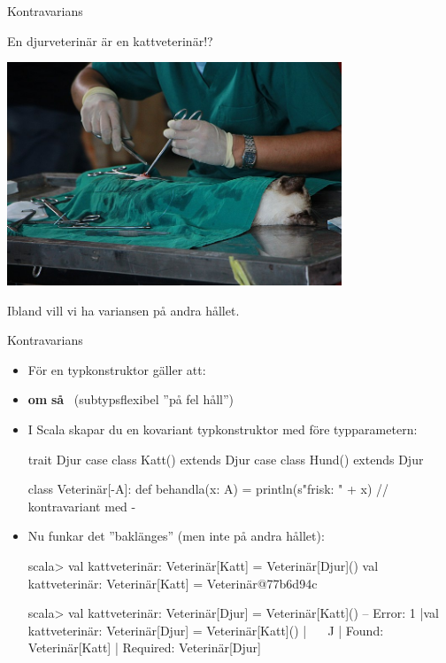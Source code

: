 \begin{Slide}{Kontravarians}
\begin{center}
En djurveterinär är en kattveterinär!?

\includegraphics[width=0.75\textwidth]{../img/cat-vet.jpg}  

Ibland vill vi ha variansen på andra hållet.
\end{center}
\end{Slide}

\begin{Slide}{Kontravarians }
\begin{itemize}\SlideFontSmall
\item För en  typkonstruktor  gäller att: 
\item[] \textbf{om}  \textbf{så} ~(subtypsflexibel ''på fel håll'')
\item I Scala skapar du en kovariant typkonstruktor med \code{-} före typparametern:
\begin{Code}
trait Djur 
case class Katt() extends Djur
case class Hund() extends Djur

class Veterinär[-A]:
  def behandla(x: A) = println(s"frisk: " + x)  // kontravariant med -
\end{Code}
\pause
\item Nu funkar det ''baklänges'' (men inte på andra hållet):
\begin{REPLsmall}
scala> val kattveterinär: Veterinär[Katt] = Veterinär[Djur]()
val kattveterinär: Veterinär[Katt] = Veterinär@77b6d94c

scala> val kattveterinär: Veterinär[Djur] = Veterinär[Katt]()
-- Error:
1 |val kattveterinär: Veterinär[Djur] = Veterinär[Katt]()
  |                                     ^^^^^^^^^^^^^^^^^
  |                                     Found:    Veterinär[Katt]
  |                                     Required: Veterinär[Djur]
\end{REPLsmall}
\end{itemize}

\end{Slide}

